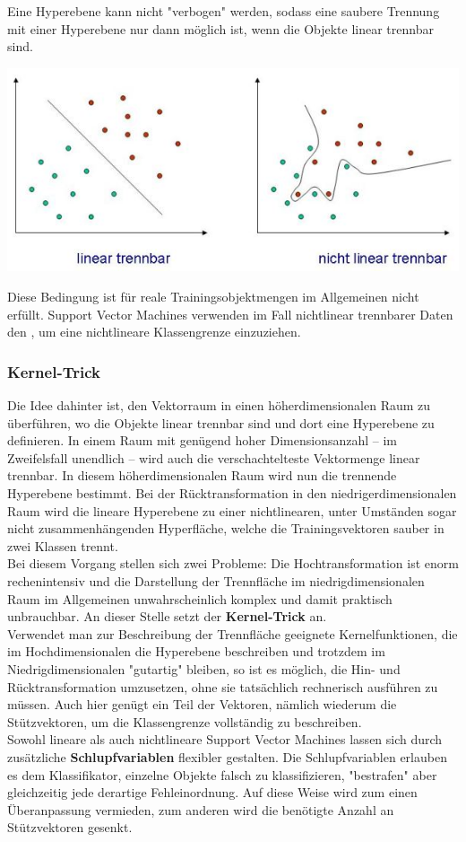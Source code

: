 \documentclass[12pt]{article}
\begin{document}
Eine Hyperebene kann nicht "verbogen" werden, sodass eine saubere Trennung mit einer Hyperebene nur dann möglich ist, wenn die Objekte linear trennbar sind.\\ 
\begin{center}  
\includegraphics{Trennbarkeit}
\end{center}
Diese Bedingung ist für reale Trainingsobjektmengen im Allgemeinen nicht erfüllt. Support Vector Machines verwenden im Fall nichtlinear trennbarer Daten den {\color{blue}{Kernel-Trick}}, um eine nichtlineare Klassengrenze einzuziehen.\\

\subsubsection{Kernel-Trick} 
Die Idee dahinter ist, den Vektorraum in einen höherdimensionalen Raum zu überführen, wo die Objekte linear trennbar sind und dort eine Hyperebene zu definieren. In einem Raum mit genügend hoher Dimensionsanzahl – im Zweifelsfall unendlich – wird auch die verschachtelteste Vektormenge linear trennbar. In diesem höherdimensionalen Raum wird nun die trennende Hyperebene bestimmt. Bei der Rücktransformation in den niedrigerdimensionalen Raum wird die lineare Hyperebene zu einer nichtlinearen, unter Umständen sogar nicht zusammenhängenden Hyperfläche, welche die Trainingsvektoren sauber in zwei Klassen trennt.\\
Bei diesem Vorgang stellen sich zwei Probleme: Die Hochtransformation ist enorm rechenintensiv und die Darstellung der Trennfläche im niedrigdimensionalen Raum im Allgemeinen unwahrscheinlich komplex und damit praktisch unbrauchbar. An dieser Stelle setzt der \textbf{Kernel-Trick} an. \\ Verwendet man zur Beschreibung der Trennfläche geeignete Kernelfunktionen, die im Hochdimensionalen die Hyperebene beschreiben und trotzdem im Niedrigdimensionalen "gutartig" bleiben, so ist es möglich, die Hin- und Rücktransformation umzusetzen, ohne sie tatsächlich rechnerisch ausführen zu müssen. Auch hier genügt ein Teil der Vektoren, nämlich wiederum die Stützvektoren, um die Klassengrenze vollständig zu beschreiben.\\
Sowohl lineare als auch nichtlineare Support Vector Machines lassen sich durch zusätzliche \textbf{Schlupfvariablen} flexibler gestalten. Die Schlupfvariablen erlauben es dem Klassifikator, einzelne Objekte falsch zu klassifizieren, "bestrafen" aber gleichzeitig jede derartige Fehleinordnung. Auf diese Weise wird zum einen Überanpassung vermieden, zum anderen wird die benötigte Anzahl an Stützvektoren gesenkt.
\end{document}
